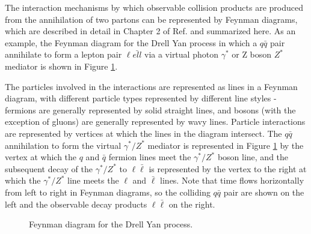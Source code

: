 The interaction mechanisms by which observable collision products are produced from the annihilation of two partons can be represented by Feynman diagrams, which are described in detail in Chapter 2 of Ref. \cite{griffiths_2008} and summarized here. As an example, the Feynman diagram for the Drell Yan process in which a \(q\bar{q}\) pair annihilate to form a lepton pair \(\ell\bar{ell}\) via a virtual photon \(\gamma^{*}\) or Z boson \(Z^{*}\) mediator is shown in Figure \ref{fig:drell_yan}. 

The particles involved in the interactions are represented as lines in a Feynman diagram, with different particle types represented by different line styles - fermions are generally represented by solid straight lines, and bosons (with the exception of gluons) are generally represented by wavy lines. Particle interactions are represented by vertices at which the lines in the diagram intersect. The \(q\bar{q}\) annihilation to form the virtual \(\gamma^{*}/Z^{*}\) mediator is represented in Figure \ref{fig:drell_yan} by the vertex at which the \(q\) and \(\bar{q}\) fermion lines meet the \(\gamma^{*}/Z^{*}\) boson line, and the subsequent decay of the  \(\gamma^{*}/Z^{*}\) to \(\ell\bar{\ell}\) is represented by the vertex to the right at which the \(\gamma^{*}/Z^{*}\) line meets the \(\ell\) and \(\bar{\ell}\) lines. Note that time flows horizontally from left to right in Feynman diagrams, so the colliding \(q\bar{q}\) pair are shown on the left and the observable decay products \(\ell\bar{\ell}\) on the right.

\begin{figure}[hp]
	\centering
	\caption{Feynman diagram for the Drell Yan process.}
	\label{fig:drell_yan}
\end{figure}

